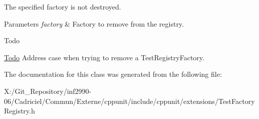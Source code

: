 The specified factory is not destroyed. 
\begin{DoxyParams}{Parameters}
{\em factory} & Factory to remove from the registry. \\
\hline
\end{DoxyParams}
\begin{DoxyRefDesc}{Todo}
\item[\hyperlink{todo__todo000001}{Todo}]Address case when trying to remove a Test\-Registry\-Factory. \end{DoxyRefDesc}


The documentation for this class was generated from the following file\-:\begin{DoxyCompactItemize}
\item 
X\-:/\-Git\-\_\-\-Repository/inf2990-\/06/\-Cadriciel/\-Commun/\-Externe/cppunit/include/cppunit/extensions/Test\-Factory\-Registry.\-h\end{DoxyCompactItemize}
